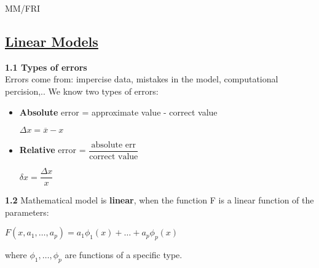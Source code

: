 \documentclass{article}
\begin{document}
\begin{center}
	{\small MM/FRI \par}
\end{center}

\begin{multicols}{2}

	\section{\underline{Linear Models}}

	\textbf{1.1 Types of errors}\\
	Errors come from: impercise data, mistakes in the model, computational percision,..
	We know two types of errors:
	\begin{itemize}
		\item \textbf{Absolute} error = approximate value - correct value
		      \begin{center}
			      \begin{math}
				      \Delta x = \overline{x} - x
			      \end{math}
		      \end{center}
		\item \textbf{Relative} error = $\dfrac{\text{absolute err}}{\text{correct value}}$
		      \begin{center}
			      \begin{math}
				      \delta x = \dfrac{\Delta x}{x}
			      \end{math}
		      \end{center}
	\end{itemize}

	\textbf{1.2} Mathematical model is \textbf{linear},
	when the function F is a linear function of the parameters:
	\begin{center}
		\begin{math}
			F(x, a_1, \dots, a_p) = a_1 \phi_1(x) + \dots + a_p \phi_p(x)
		\end{math}
	\end{center}
	where $\phi_1, \dots, \phi_p$ are functions of a specific type.



\end{multicols}
\end{document}
